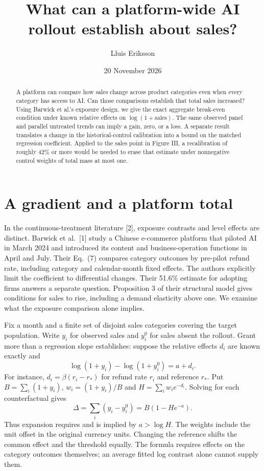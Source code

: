 \documentclass[11pt,a4paper]{article}
\title{What can a platform-wide AI rollout establish about sales?}
\author{Lluis Eriksson}\date{20 November 2026}
\begin{document}
\maketitle
\begin{abstract}
A platform can compare how sales change across product categories even when every category has access to AI. Can those comparisons establish that total sales increased? Using Barwick et al.'s exposure design, we give the exact aggregate break-even condition under known relative effects on $\log(1+\mathrm{sales})$. The same observed panel and parallel untreated trends can imply a gain, zero, or a loss. A separate result translates a change in the historical-control calibration into a bound on the matched regression coefficient. Applied to the sales point in Figure III, a recalibration of roughly 42\% or more would be needed to erase that estimate under nonnegative control weights of total mass at most one.
\end{abstract}

\section*{A gradient and a platform total}
In the continuous-treatment literature [2], exposure contrasts and level effects are distinct. Barwick et al.~[1] study a Chinese e-commerce platform that piloted AI in March 2024 and introduced its content and business-operation functions in April and July. Their Eq.~(7) compares category outcomes by pre-pilot refund rate, including category and calendar-month fixed effects. The authors explicitly limit the coefficient to differential changes. Their 51.6\% estimate for adopting firms answers a separate question. Proposition 3 of their structural model gives conditions for sales to rise, including a demand elasticity above one. We examine what the exposure comparison alone implies.

Fix a month and a finite set of disjoint sales categories covering the target population. Write $y_i$ for observed sales and $y_i^0$ for sales absent the rollout. Grant more than a regression slope establishes: suppose the relative effects $d_i$ are known exactly and
\[
 \log(1+y_i)-\log(1+y_i^0)=a+d_i.
\]
For instance, $d_i=\beta(r_i-r_*)$ for refund rate $r_i$ and reference $r_*$. Put $B=\sum_i(1+y_i)$, $w_i=(1+y_i)/B$ and $H=\sum_i w_i e^{-d_i}$. Solving for each counterfactual gives
\[
 \Delta=\sum_i(y_i-y_i^0)=B(1-He^{-a}).
\]
Thus expansion requires and is implied by $a>\log H$. The weights include the unit offset in the original currency units. Changing the reference shifts the common effect and the threshold equally. The formula requires effects on the category outcomes themselves; an average fitted log contrast alone cannot supply them.
\end{document}
